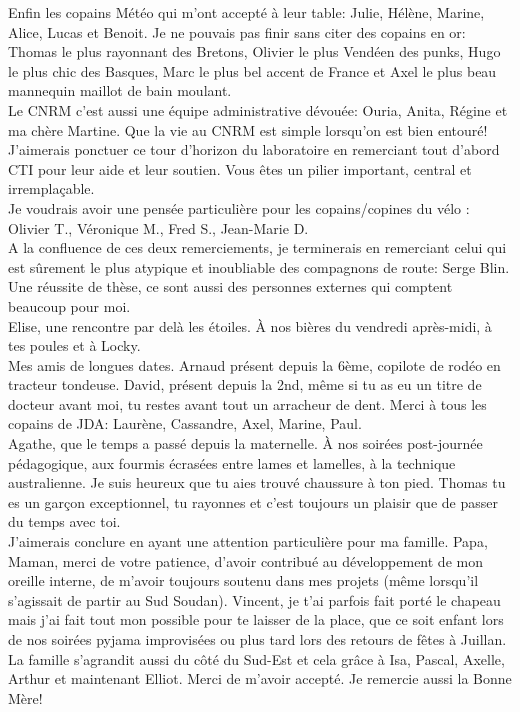 \documentclass[a4paper,12pt,twoside]{StyleThese}
\begin{document}
\noindent Enfin les copains Météo qui m’ont accepté à leur table: Julie, Hélène, Marine, Alice, Lucas et Benoit. Je ne pouvais pas finir sans citer des copains en or: Thomas le plus rayonnant des Bretons, Olivier le plus Vendéen des punks, Hugo le plus chic des Basques, Marc le plus bel accent de France et Axel le plus beau mannequin maillot de bain moulant.\\

\noindent Le CNRM c’est aussi une équipe administrative dévouée: Ouria, Anita, Régine et ma chère Martine. Que la vie au CNRM est simple lorsqu’on est bien entouré! \\

\noindent J’aimerais ponctuer ce tour d’horizon du laboratoire en remerciant tout d’abord CTI pour leur aide et leur soutien. Vous êtes un pilier important, central et irremplaçable. \\
\noindent Je voudrais avoir une pensée particulière pour les copains/copines du vélo : Olivier T., Véronique M., Fred S., Jean-Marie D.\\
\noindent A la confluence de ces deux remerciements, je terminerais en remerciant celui qui est sûrement le  plus atypique et inoubliable des compagnons de route: Serge Blin.\\

\noindent Une réussite de thèse, ce sont aussi des personnes externes qui comptent beaucoup pour moi.\\
\noindent Elise, une rencontre par delà les étoiles. À nos bières du vendredi après-midi, à tes poules et à Locky.\\
\noindent Mes amis de longues dates. Arnaud présent depuis la 6ème, copilote de rodéo en tracteur tondeuse. David, présent depuis la 2nd, même si tu as eu un titre de docteur avant moi, tu restes avant tout un arracheur de dent.
Merci à tous les copains de JDA: Laurène, Cassandre, Axel, Marine, Paul.\\
Agathe, que le temps a passé depuis la maternelle. À nos soirées post-journée pédagogique, aux fourmis écrasées entre lames et lamelles, à la technique australienne. Je suis heureux que tu aies trouvé chaussure à ton pied. Thomas tu es un garçon exceptionnel, tu rayonnes et c'est toujours un plaisir que de passer du temps avec toi.\\

\noindent J’aimerais conclure en ayant une attention particulière pour ma famille. Papa, Maman, merci de votre patience, d’avoir contribué au développement de mon oreille interne, de m’avoir toujours soutenu dans mes projets (même lorsqu’il s’agissait de partir au Sud Soudan). Vincent,  je t’ai parfois fait porté le chapeau mais j’ai fait tout mon possible  pour te laisser de la place, que ce soit enfant lors de nos soirées pyjama improvisées ou plus tard lors des retours de fêtes à Juillan.\\
\noindent La famille s’agrandit aussi du côté du Sud-Est et cela grâce à Isa, Pascal, Axelle, Arthur et maintenant Elliot. Merci de m’avoir accepté. Je remercie aussi la Bonne Mère!\\
\end{document}

